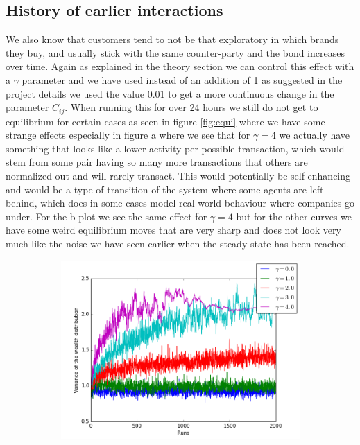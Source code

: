 \documentclass[a4paper,11pt]{article}
\begin{document}
{\subsection{History of earlier interactions}
We also know that customers tend to not be that exploratory in which brands they buy, and usually stick with the same counter-party and the bond increases over time.  Again as explained in the theory section we can control this effect with a $\gamma$ parameter and we have used instead of an addition of 1 as suggested in the project details we used the value 0.01 to get a more continuous change in the parameter $C_{ij}$. When running this for over 24 hours we still do not get to equilibrium for certain cases as seen in figure \ref{fig:equi} where we have some strange effects especially in figure a where we see that for $\gamma=4$ we actually have something that looks like a lower activity per possible transaction, which would stem from some pair having so many more transactions that others are normalized out and will rarely transact. This would potentially be self enhancing and would be a type of transition of the system where some agents are left behind, which does in some cases model real world behaviour where companies go under. For the b plot we see the same effect for $\gamma=4$ but for the other curves we have some weird equilibrium moves that are very sharp and does not look very much like the noise we have seen earlier when the steady state has been reached. 
\begin{figure}[H]
	\centering
	\begin{subfigure}[t]{0.45\textwidth}
		\includegraphics[scale=0.4]{historic_lambda=0_5_alpha=1init}

\end{subfigure}
\end{figure}}
\end{document}
